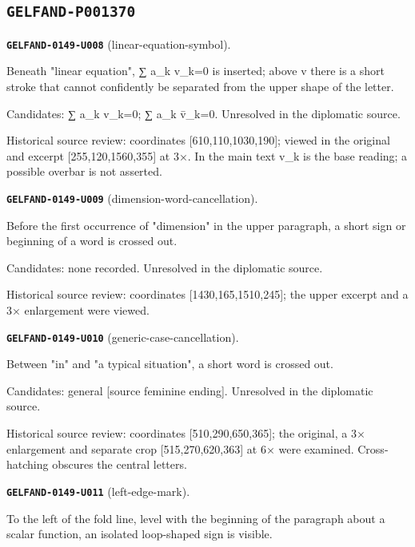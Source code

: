 \documentclass[11pt]{article}
\theoremstyle{definition}
\theoremstyle{remark}
\begin{document}
\subsection*{\texttt{GELFAND-P001370}}
\noindent\leavevmode{}\label{GELFAND-P001370:linear-equation-symbol:note}\textbf{\texttt{GELFAND-0149-U008}} (linear-equation-symbol).\par\nopagebreak[4]
Beneath "linear equation", ∑ a\_k v\_k=0 is inserted; above v there is a short stroke that cannot confidently be separated from the upper shape of the letter.\par
Candidates: ∑ a\_k v\_k=0; ∑ a\_k v̄\_k=0. Unresolved in the diplomatic source.\par
Historical source review: coordinates [610,110,1030,190]; viewed in the original and excerpt [255,120,1560,355] at 3×. In the main text v\_k is the base reading; a possible overbar is not asserted.\par\medskip
\noindent\leavevmode{}\label{GELFAND-P001370:dimension-word-cancellation:note}\textbf{\texttt{GELFAND-0149-U009}} (dimension-word-cancellation).\par\nopagebreak[4]
Before the first occurrence of "dimension" in the upper paragraph, a short sign or beginning of a word is crossed out.\par
Candidates: none recorded. Unresolved in the diplomatic source.\par
Historical source review: coordinates [1430,165,1510,245]; the upper excerpt and a 3× enlargement were viewed.\par\medskip
\noindent\leavevmode{}\label{GELFAND-P001370:generic-case-cancellation:note}\textbf{\texttt{GELFAND-0149-U010}} (generic-case-cancellation).\par\nopagebreak[4]
Between "in" and "a typical situation", a short word is crossed out.\par
Candidates: general [source feminine ending]. Unresolved in the diplomatic source.\par
Historical source review: coordinates [510,290,650,365]; the original, a 3× enlargement and separate crop [515,270,620,363] at 6× were examined. Cross-hatching obscures the central letters.\par\medskip
\noindent\leavevmode{}\label{GELFAND-P001370:left-edge-mark:note}\textbf{\texttt{GELFAND-0149-U011}} (left-edge-mark).\par\nopagebreak[4]
To the left of the fold line, level with the beginning of the paragraph about a scalar function, an isolated loop-shaped sign is visible.\par
\end{document}
